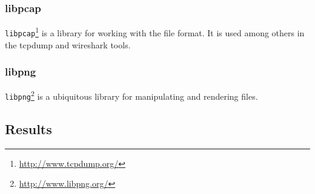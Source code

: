 \subsubsection{libpcap}
\texttt{libpcap}\footnote{\url{http://www.tcpdump.org/}} is a library for working with the \pcap file format. It
is used among others in the tcpdump and wireshark tools.

\subsubsection{libpng}
\texttt{libpng}\footnote{\url{http://www.libpng.org/}} is a ubiquitous library for manipulating and rendering
\png files.

\subsection{Results}


